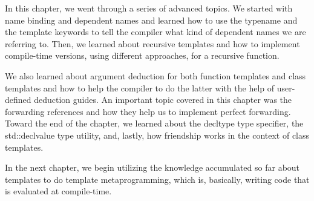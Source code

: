 In this chapter, we went through a series of advanced topics. We started with name binding and dependent names and learned how to use the typename and the template keywords to tell the compiler what kind of dependent names we are referring to. Then, we learned about recursive templates and how to implement compile-time versions, using different approaches, for a recursive function.

We also learned about argument deduction for both function templates and class templates and how to help the compiler to do the latter with the help of user-defined deduction guides. An important topic covered in this chapter was the forwarding references and how they help us to implement perfect forwarding. Toward the end of the chapter, we learned about the decltype type specifier, the std::declvalue type utility, and, lastly, how friendship works in the context of class templates.

In the next chapter, we begin utilizing the knowledge accumulated so far about templates to do template metaprogramming, which is, basically, writing code that is evaluated at compile-time.